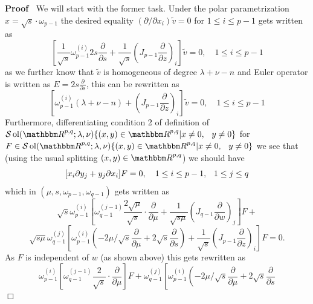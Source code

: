 \documentclass{article}
\newcommand{\tmop}[1]{\ensuremath{\operatorname{#1}}}
\newenvironment{proof}{\noindent\textbf{Proof\ }}{\hspace*{\fill}$\Box$\medskip}
\numberwithin{definition}{section}
\numberwithin{lemma}{section}
\numberwithin{proposition}{section}
{\theorembodyfont{\rmfamily}\newtheorem{remark}{Remark}
\numberwithin{remark}{section}
}
\begin{document}
\begin{proof}
  We will start with the former task. Under the polar parametrization $x =
  \sqrt{s} \cdot \omega_{p - 1}$ the desired equality $(\partial / \partial
  x_i)  \tilde{v} = 0$ for $1 \leq i \leq p - 1$ gets written as
  \[ \left[ \frac{1}{\sqrt{s}} \omega_{p - 1}^{(i)} 2 s
     \frac{\partial}{\partial s} + \frac{1}{\sqrt{s}}  \left( J_{p - 1} 
     \frac{\partial}{\partial z} \right)_i \right]  \tilde{v} = 0,
     \hspace{1em} 1 \leq i \leq p - 1 \]
  as we further know that $\tilde{v}$ is homogeneous of degree $\lambda + \nu
  - n$ and Euler operator is written as $E = 2 s \frac{\partial}{\partial s}$,
  this can be rewritten as
  \begin{equation}
    \left[ \omega_{p - 1}^{(i)} (\lambda + \nu - n) + \left( J_{p - 1} 
    \frac{\partial}{\partial z} \right)_i \right]  \tilde{v} = 0, \hspace{1em}
    1 \leq i \leq p - 1 \label{eq:sing-q-dx}
  \end{equation}
  Furthermore, differentiating condition 2 of definition of $\mathcal{S}
  \tmop{ol} ( \R^{p, q} ; \lambda, \nu)\{(x, y) \in \R^{p, q} |x \neq 0,
  \hspace{0.75em} y \neq 0\}$ for $F \in \mathcal{S} \tmop{ol} ( \R^{p, q} ;
  \lambda, \nu)\{(x, y) \in \R^{p, q} |x \neq 0, \hspace{0.75em} y \neq 0\}$
  we see that (using the usual splitting $(x, y) \in \R^{p, q}$) we should
  have
  \[ [ x_i \partial y_j + y_j \partial x_i] F = 0, \hspace{1em} 1 \le i \le p
     - 1, \hspace{0.75em} 1 \leq j \leq q \]
  which in $(\mu, s, \omega_{p - 1}, \omega_{q - 1})$ gets written as
  \[ \sqrt{s} \omega^{(i)}_{p - 1}  \left[ \omega^{(j - 1)}_{q - 1}  \frac{2
     \sqrt{\mu}}{\sqrt{s}} \cdot \frac{\partial}{\partial \mu} +
     \frac{1}{\sqrt{s \mu}}  \left( J_{q - 1}  \frac{\partial}{\partial w}
     \right)_j \right] F + \]
  \[ \sqrt{s \mu} \omega^{(j)}_{q - 1}  \left[ \omega_{p - 1}^{(i)}  \left( -
     2 \mu / \sqrt{s}  \frac{\partial}{\partial \mu} + 2 \sqrt{s} 
     \frac{\partial}{\partial s} \right) + \frac{1}{\sqrt{s}}  \left( J_{p -
     1}  \frac{\partial}{\partial z} \right)_i \right] F = 0. \]
  As $F$ is independent of $w$ (as shown above) this gets rewritten as
  \[ \omega^{(i)}_{p - 1}  \left[ \omega^{(j - 1)}_{q - 1}  \frac{2}{\sqrt{s}}
     \cdot \frac{\partial}{\partial \mu} \right] F + \omega^{(j)}_{q - 1} 
     \left[ \omega_{p - 1}^{(i)}  \left( - 2 \mu / \sqrt{s} 
     \frac{\partial}{\partial \mu} + 2 \sqrt{s}  \frac{\partial}{\partial s}
\]
\end{proof}
\end{document}
